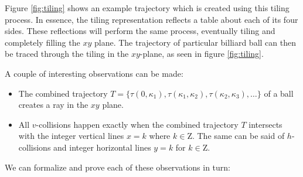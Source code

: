 Figure \ref{fig:tiling} shows an example trajectory which is created using this tiling process. In essence, the tiling representation reflects a table about each of its four sides. These reflections will perform the same process, eventually tiling and completely filling the $xy$ plane. The trajectory of particular billiard ball can then be traced through the tiling in the $xy$-plane, as seen in figure \ref{fig:tiling}.


A couple of interesting observations can be made:

\begin{itemize}
  \item The combined trajectory $T = \{\tau(0, \kappa_1), \tau(\kappa_1, \kappa_2), \tau(\kappa_2, \kappa_3), \ldots \}$ of a ball creates a ray in the $xy$ plane.
  \item All $v$-collisions happen exactly when the combined trajectory $T$ intersects with the integer vertical lines $x = k$ where $k \in \mathrm{Z}$. The same can be said of $h$-collisions and integer horizontal lines $y = k$ for $k \in \mathrm{Z}$.
\end{itemize}

We can formalize and prove each of these observations in turn:

